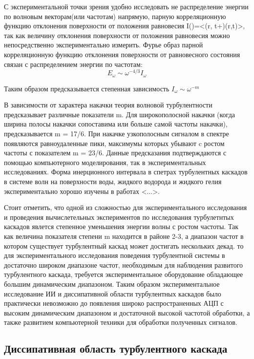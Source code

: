 С экспериментальной точки зрения удобно исследовать не распределение энергии по волновым векторам(или частотам) напрямую, парную корреляционную функцию отклонения поверхности от положения равновесия I()=<(r, t+)(r,t)>, так как величину отклонения поверхности от положения равновесия можно непосредственно экспериментально измерить. Фурье образ парной корреляционную функцию отклонения поверхности от равновесного состояния связан с распределением энергии по частотам:
\begin{equation}
E_\omega \sim \omega^{-4/3}I_\omega
\end{equation}

Таким образом предсказывается степенная зависимость $I_\omega \sim \omega^{-m}$

В зависимости от характера накачки теория волновой турбулентности предсказывает различные показатели m. Для широкополосной накачки (когда ширина полосы накачки сопоставима или больше самой частоты накачки), предсказывается m = 17/6. При накачке узкополосным сигналом в спектре появляются равноудаленные пики, максимумы которых убывают c ростом частоты с показателем m = 23/6. Данные предсказания подтверждаются с помощью компьютерного моделирования, так в экспериментальных исследованиях. Форма инерционного интервала в спетрах турбулентных каскадов в системе волн на поверхности воды, жидкого водорода и жидкого гелия экспериментально хорошо изучены в работах <...>. 

Стоит отметить, что одной из сложностью для экспериментального исследования и проведения вычислетельных экспериментов по исследования турбулетнтых каскадов явлется степенное уменьшения энергии волны с ростом частоты. Так как величина показателя степени m находится в районе 2-3, а диапазон частот в котором существует турбулентный каскад может достигать нескольких декад. то для экспериментального исследования поведения турбулентной системы в достаточно широком диапазоне частот, необходимым для наблюдения развитого турбулентного каскада, требуется экспериментальное оборудование обладающее большим динамическим диапазоном. Таким образом экспериментальное исследование ИИ и диссипативной области турбулентных каскадов было практически невозможно до появления широко распространенных АЦП с высоким динамическим диапазоном и достаточной высокой частотой обработки, а также развитием компьютерной техники для обработки полученных сигналов.
\subsection{Диссипативная область турбулентного каскада} \label{subsect1_1_4}

